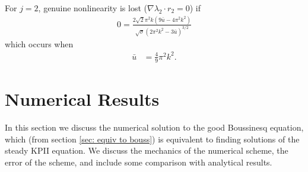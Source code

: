 \documentclass[12pt]{article}
\numberwithin{equation}{section}
\begin{document}
For $j= 2$, genuine nonlinearity is lost ($\nabla \lambda_2 \cdot r_2=0$) if 
\begin{align}
    0=\frac{2 \sqrt{2} \pi ^2 k \left(9 \bar u-4 \pi ^2 k^2\right)}{\sqrt{\sigma} \left(2 \pi ^2 k^2-3 \bar u\right)^{3/2}}
\end{align}
which occurs when 
\begin{align}
    \bar u &= \frac{4}{9}\pi^2k^2.\label{nonlinearity condition 2}
\end{align}

\section{Numerical Results}
In this section we discuss the numerical solution to the good Boussinesq equation, which (from section \ref{sec: equiv to bouss}) is equivalent to finding solutions of the steady KPII equation. We discuss the mechanics of the numerical scheme, the error of the scheme, and include some comparison with analytical results.
\end{document}
